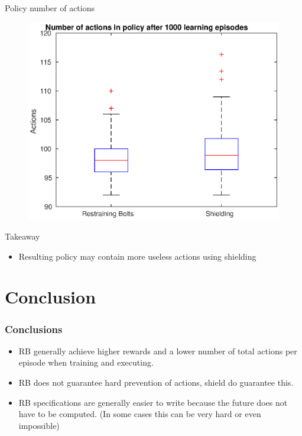 \documentclass[kul]{kulakbeamer}
\begin{document}
\begin{frame}{Policy number of actions}
    \begin{figure}
        \centering
        \includegraphics[width=.84\textwidth]{policy_actions.eps}
    \end{figure}{}
\end{frame}{}
\begin{frame}{Takeaway}
    \begin{itemize}
        \item Resulting policy may contain more useless actions using shielding
    \end{itemize}
\end{frame}
\section{Conclusion}
\begin{frame}
\frametitle{Conclusions}
\begin{itemize}
    \item RB generally achieve higher rewards and a lower number of total actions per episode when training and executing.
    \item RB does not guarantee hard prevention of actions, shield do guarantee this.
    \item RB specifications are generally easier to write because the future does not have to be computed. (In some cases this can be very hard or even impossible)
\end{itemize}
\end{frame}
\end{document}
